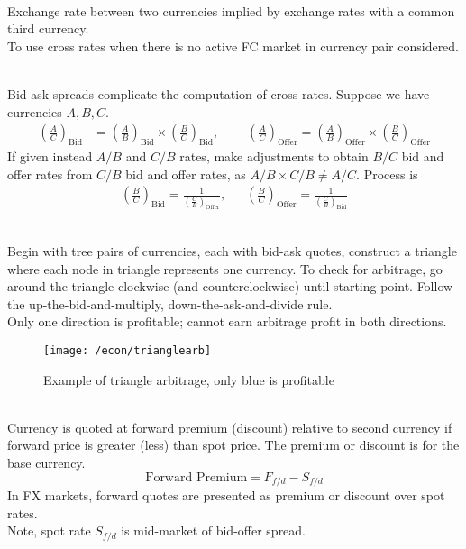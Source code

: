 \begin{definition} \\
Exchange rate between two currencies implied by exchange rates with a common third currency.\\
To use cross rates when there is no active FC market in currency pair considered.
\end{definition}

\begin{remark} \\
Bid-ask spreads complicate the computation of cross rates. Suppose we have currencies $A,B,C$.
\begin{align}
\left(\frac{A}{C} \right)_{\text{Bid}} &= \left(\frac{A}{B} \right)_{\text{Bid}} \times \left(\frac{B}{C} \right)_{\text{Bid}}, \ \ \ \ \ \ \ \ \ \ \left(\frac{A}{C} \right)_{\text{Offer}}  = \left(\frac{A}{B} \right)_{\text{Offer}} \times \left(\frac{B}{C} \right)_{\text{Offer}} \nonumber
\end{align}
If given instead $A/B$ and $C/B$ rates, make adjustments to obtain $B/C$ bid and offer rates from $C/B$ bid and offer rates, as $A/B \times C/B \neq A/C$. Process is
\begin{align}
\left(\frac{B}{C} \right)_{\text{Bid}} = \frac{1}{\left(\frac{C}{B} \right)_{\text{Offer}}}, \ \ \ \ \ \ \ \left(\frac{B}{C} \right)_{\text{Offer}} = \frac{1}{\left(\frac{C}{B} \right)_{\text{Bid}}} \nonumber
\end{align}
\end{remark}

\begin{method} \\
Begin with tree pairs of currencies, each with bid-ask quotes, construct a triangle where each node in triangle represents one currency. To check for arbitrage, go around the triangle clockwise (and counterclockwise) until starting point. Follow the up-the-bid-and-multiply, down-the-ask-and-divide rule.\\
Only one direction is profitable; cannot earn arbitrage profit in both directions.
\end{method}

\begin{figure}[H]
\centering
\texttt{[image: /econ/trianglearb]}
\caption{Example of triangle arbitrage, only blue is profitable}
\end{figure}

\begin{definition} \\
Currency is quoted at forward premium (discount) relative to second currency if forward price is greater (less) than spot price. The premium or discount is for the base currency.
\begin{equation}
\text{Forward Premium} = F_{f/d} - S_{f/d} \nonumber
\end{equation}
In FX markets, forward quotes are presented as premium or discount over spot rates.\\
Note, spot rate $S_{f/d}$ is mid-market of bid-offer spread.
\end{definition}

